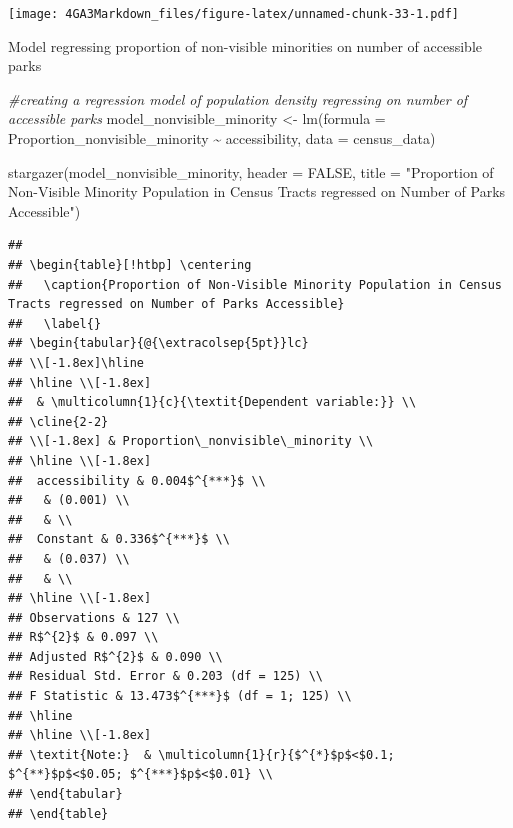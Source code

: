 \documentclass[
]{article}
\newenvironment{Shaded}{\begin{snugshade}}{\end{snugshade}}
\newcommand{\AttributeTok}[1]{\textcolor[rgb]{0.77,0.63,0.00}{#1}}
\newcommand{\CommentTok}[1]{\textcolor[rgb]{0.56,0.35,0.01}{\textit{#1}}}
\newcommand{\ConstantTok}[1]{\textcolor[rgb]{0.00,0.00,0.00}{#1}}
\newcommand{\FunctionTok}[1]{\textcolor[rgb]{0.00,0.00,0.00}{#1}}
\newcommand{\NormalTok}[1]{#1}
\newcommand{\OtherTok}[1]{\textcolor[rgb]{0.56,0.35,0.01}{#1}}
\newcommand{\SpecialCharTok}[1]{\textcolor[rgb]{0.00,0.00,0.00}{#1}}
\newcommand{\StringTok}[1]{\textcolor[rgb]{0.31,0.60,0.02}{#1}}
\begin{document}
\texttt{[image: 4GA3Markdown\_files/figure-latex/unnamed-chunk-33-1.pdf]}

Model regressing proportion of non-visible minorities on number of
accessible parks

\begin{Shaded}
\begin{Highlighting}[]
\CommentTok{\#creating a regression model of population density regressing on number of accessible parks}
\NormalTok{model\_nonvisible\_minority }\OtherTok{\textless{}{-}} \FunctionTok{lm}\NormalTok{(}\AttributeTok{formula =}\NormalTok{ Proportion\_nonvisible\_minority }\SpecialCharTok{\textasciitilde{}}\NormalTok{ accessibility, }
             \AttributeTok{data =}\NormalTok{ census\_data)}

\FunctionTok{stargazer}\NormalTok{(model\_nonvisible\_minority,}
          \AttributeTok{header =} \ConstantTok{FALSE}\NormalTok{,}
          \AttributeTok{title =} \StringTok{"Proportion of Non{-}Visible Minority Population in Census Tracts regressed on Number of Parks Accessible"}\NormalTok{)}
\end{Highlighting}
\end{Shaded}

\begin{verbatim}
## 
## \begin{table}[!htbp] \centering 
##   \caption{Proportion of Non-Visible Minority Population in Census Tracts regressed on Number of Parks Accessible} 
##   \label{} 
## \begin{tabular}{@{\extracolsep{5pt}}lc} 
## \\[-1.8ex]\hline 
## \hline \\[-1.8ex] 
##  & \multicolumn{1}{c}{\textit{Dependent variable:}} \\ 
## \cline{2-2} 
## \\[-1.8ex] & Proportion\_nonvisible\_minority \\ 
## \hline \\[-1.8ex] 
##  accessibility & 0.004$^{***}$ \\ 
##   & (0.001) \\ 
##   & \\ 
##  Constant & 0.336$^{***}$ \\ 
##   & (0.037) \\ 
##   & \\ 
## \hline \\[-1.8ex] 
## Observations & 127 \\ 
## R$^{2}$ & 0.097 \\ 
## Adjusted R$^{2}$ & 0.090 \\ 
## Residual Std. Error & 0.203 (df = 125) \\ 
## F Statistic & 13.473$^{***}$ (df = 1; 125) \\ 
## \hline 
## \hline \\[-1.8ex] 
## \textit{Note:}  & \multicolumn{1}{r}{$^{*}$p$<$0.1; $^{**}$p$<$0.05; $^{***}$p$<$0.01} \\ 
## \end{tabular} 
## \end{table}
\end{verbatim}
\end{document}
